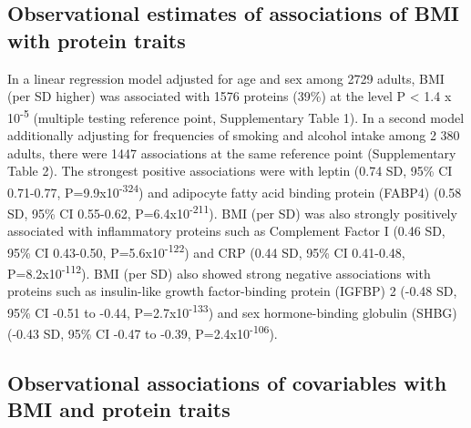 \documentclass[11pt,twoside]{bristolthesis}
\begin{document}
\hypertarget{observational-estimates-of-associations-of-bmi-with-protein-traits}{%
\subsection{Observational estimates of associations of BMI with protein traits}\label{observational-estimates-of-associations-of-bmi-with-protein-traits}}

In a linear regression model adjusted for age and sex among 2729 adults, BMI (per SD higher) was associated with 1576 proteins (39\%) at the level P \textless{} 1.4 x 10\textsuperscript{-5} (multiple testing reference point, Supplementary Table 1). In a second model additionally adjusting for frequencies of smoking and alcohol intake among 2 380 adults, there were 1447 associations at the same reference point (Supplementary Table 2). The strongest positive associations were with leptin (0.74 SD, 95\% CI 0.71-0.77, P=9.9x10\textsuperscript{-324}) and adipocyte fatty acid binding protein (FABP4) (0.58 SD, 95\% CI 0.55-0.62, P=6.4x10\textsuperscript{-211}). BMI (per SD) was also strongly positively associated with inflammatory proteins such as Complement Factor I (0.46 SD, 95\% CI 0.43-0.50, P=5.6x10\textsuperscript{-122}) and CRP (0.44 SD, 95\% CI 0.41-0.48, P=8.2x10\textsuperscript{-112}). BMI (per SD) also showed strong negative associations with proteins such as insulin-like growth factor-binding protein (IGFBP) 2 (-0.48 SD, 95\% CI -0.51 to -0.44, P=2.7x10\textsuperscript{-133}) and sex hormone-binding globulin (SHBG) (-0.43 SD, 95\% CI -0.47 to -0.39, P=2.4x10\textsuperscript{-106}).

\hypertarget{observational-associations-of-covariables-with-bmi-and-protein-traits}{%
\subsection{Observational associations of covariables with BMI and protein traits}\label{observational-associations-of-covariables-with-bmi-and-protein-traits}}
\end{document}
